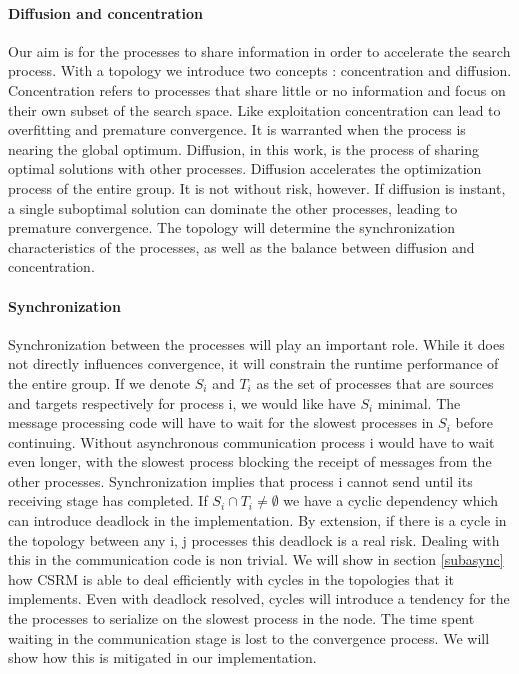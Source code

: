\paragraph{Diffusion and concentration}
Our aim is for the processes to share information in order to accelerate the search process. With a topology we introduce two concepts : concentration and diffusion. Concentration refers to processes that share little or no information and focus on their own subset of the search space. Like exploitation concentration can lead to overfitting and premature convergence. It is warranted when the process is nearing the global optimum. Diffusion, in this work, is the process of sharing optimal solutions with other processes. Diffusion accelerates the optimization process of the entire group. It is not without risk, however. If diffusion is instant, a single suboptimal solution can dominate the other processes, leading to premature convergence. 
The topology will determine the synchronization characteristics of the processes, as well as the balance between diffusion and concentration.

\paragraph{Synchronization}
Synchronization between the processes will play an important role. While it does not directly influences convergence, it will constrain the runtime performance of the entire group. If we denote $S_i$ and $T_i$ as the set of processes that are sources and targets respectively for process i, we would like have $S_i$ minimal. The message processing code will have to wait for the slowest processes in $S_i$ before continuing. Without asynchronous communication process i would have to wait even longer, with the slowest process blocking the receipt of messages from the other processes. Synchronization implies that process i cannot send until its receiving stage has completed. If $S_i \cap T_i \neq \emptyset$ we have a cyclic dependency which can introduce deadlock in the implementation. By extension, if there is a cycle in the topology between any i, j processes this deadlock is a real risk. Dealing with this in the communication code is non trivial. We will show in section \ref{subasync} how CSRM is able to deal efficiently with cycles in the topologies that it implements. Even with deadlock resolved, cycles will introduce a tendency for the the processes to serialize on the slowest process in the node. The time spent waiting in the communication stage is lost to the convergence process. We will show how this is mitigated in our implementation.

